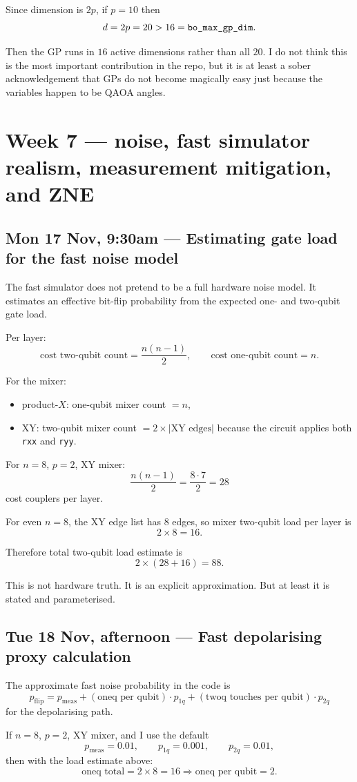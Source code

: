 \documentclass[11pt]{article}
\newcommand{\entry}[2]{\subsection*{#1 --- #2}}
\newcommand{\repo}[1]{\texttt{#1}}
\begin{document}
Since dimension is \(2p\), if \(p=10\) then
\[
d = 2p = 20 > 16 = \text{\repo{bo\_max\_gp\_dim}}.
\]

Then the GP runs in \(16\) active dimensions rather than all \(20\).
I do not think this is the most important contribution in the repo, but it is at least a sober
acknowledgement that GPs do not become magically easy just because the variables happen to be QAOA angles.

\section*{Week 7 --- noise, fast simulator realism, measurement mitigation, and ZNE}

\entry{Mon 17 Nov, 9:30am}{Estimating gate load for the fast noise model}

The fast simulator does not pretend to be a full hardware noise model. It estimates an effective
bit-flip probability from the expected one- and two-qubit gate load.

Per layer:
\[
\text{cost two-qubit count} = \frac{n(n-1)}{2},
\qquad
\text{cost one-qubit count} = n.
\]

For the mixer:
\begin{itemize}[leftmargin=1.4em]
\item product-\(X\): one-qubit mixer count \(= n\),
\item XY: two-qubit mixer count \(= 2 \times |\text{XY edges}|\) because the circuit applies both
\repo{rxx} and \repo{ryy}.
\end{itemize}

For \(n=8\), \(p=2\), XY mixer:
\[
\frac{n(n-1)}{2} = \frac{8\cdot 7}{2} = 28
\]
cost couplers per layer.

For even \(n=8\), the XY edge list has \(8\) edges, so mixer two-qubit load per layer is
\[
2 \times 8 = 16.
\]

Therefore total two-qubit load estimate is
\[
2 \times (28 + 16) = 88.
\]

This is not hardware truth. It is an explicit approximation. But at least it is stated and
parameterised.

\entry{Tue 18 Nov, afternoon}{Fast depolarising proxy calculation}

The approximate fast noise probability in the code is
\[
p_{\text{flip}}
=
p_{\text{meas}}
+ (\text{oneq per qubit}) \cdot p_{1q}
+ (\text{twoq touches per qubit}) \cdot p_{2q}
\]
for the depolarising path.

If \(n=8\), \(p=2\), XY mixer, and I use the default
\[
p_{\text{meas}} = 0.01,\qquad p_{1q}=0.001,\qquad p_{2q}=0.01,
\]
then with the load estimate above:
\[
\text{oneq total} = 2 \times 8 = 16
\Rightarrow \text{oneq per qubit} = 2.
 \]
\end{document}
